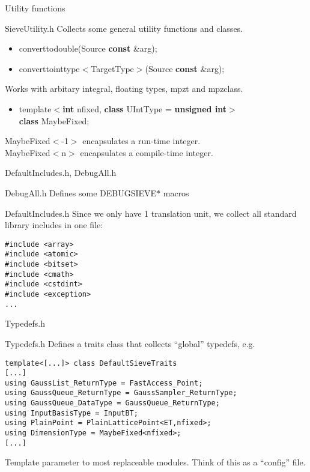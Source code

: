 \documentclass{beamer}
\begin{document}
\begin{frame}{Utility functions}
\begin{block}{SieveUtility.h}
Collects some general utility functions and classes.
\vspace{1ex}
\begin{itemize}
 \item convert\textunderscore to\textunderscore double(Source \textbf{const} \&arg);
 \item convert\textunderscore to\textunderscore inttype$<$TargetType$>$(Source \textbf{const} \&arg);
\end{itemize}
Works with arbitary integral, floating types, mpz\textunderscore t and mpz\textunderscore class.
\begin{itemize}
 \item template$<$\textbf{int} nfixed, \textbf{class} UIntType = \textbf{unsigned int}$>$\\
       \textbf{class} MaybeFixed;
\end{itemize}
MaybeFixed$<$-1$>$ encapsulates a run-time integer.\\
MaybeFixed$<$n$>$ encapsulates a compile-time integer.
\end{block}
\end{frame}

\begin{frame}[fragile]{DefaultIncludes.h, DebugAll.h}
\begin{block}{DebugAll.h}
Defines some DEBUG\textunderscore SIEVE\textunderscore $\ast$  macros
\end{block}
\begin{block}{DefaultIncludes.h}
Since we only have 1 translation unit, we collect all standard library includes in one file:
\begin{verbatim}
#include <array>
#include <atomic>
#include <bitset>
#include <cmath>
#include <cstdint>
#include <exception>
...
\end{verbatim}
\end{block}
\end{frame}

\begin{frame}[fragile]{Typedefs.h}
\begin{block}{Typedefs.h}
Defines a traits class that collects ``global'' typedefs, e.g.\\
\begin{verbatim}
template<[...]> class DefaultSieveTraits 
[...]
using GaussList_ReturnType = FastAccess_Point;
using GaussQueue_ReturnType = GaussSampler_ReturnType;
using GaussQueue_DataType = GaussQueue_ReturnType;
using InputBasisType = InputBT;
using PlainPoint = PlainLatticePoint<ET,nfixed>;
using DimensionType = MaybeFixed<nfixed>;
[...]
\end{verbatim}
Template parameter to most replaceable modules. Think of this as a ``config'' file. 
\end{block}
\end{frame}
\end{document}
